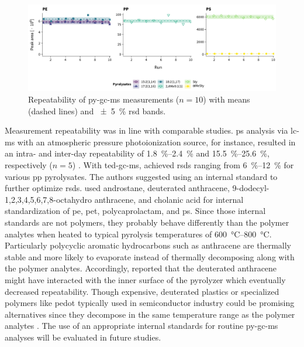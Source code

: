 \begin{figure}[t]
	\centering
	\includegraphics[width=\textwidth]{figures/py-repeatability}
	\caption[Repeatability of \ac{py-gc-ms} measurements.]{Repeatability of \ac{py-gc-ms} measurements ($n = 10$) with means (dashed lines) and \SI{+-5}{\percent} \acs{rsd} bands.}
	\label{fig:py-repeatability}
\end{figure}

Measurement repeatability was in line with comparable studies. \Ac{ps} analysis via \ac{lc-ms} with an atmospheric pressure photoionization source, for instance, resulted in an intra- and inter-day repeatability of \SIrange{1.8}{2.4}{\percent} and \SIrange{15.5}{25.6}{\percent}, respectively ($n = 5$) \citep{SchirinziTrace2019}. With \ac{ted-gc-ms}, \citet{DuemichenAutomated2019} achieved \acp{rsd} ranging from \SIrange[range-phrase = { to }]{6}{12}{\percent} for various \ac{pp} pyrolysates. The authors suggested using an internal standard to further optimize \acp{rsd}. \citet{FischerMicroplastics2019} used androstane, deuterated anthracene, 9-dodecyl-1,2,3,4,5,6,7,8-octahydro anthracene, and cholanic acid for internal standardization of \ac{pe}, \ac{pet}, polycaprolactam, and \ac{ps}. Since those internal standards are not polymers, they probably behave differently than the polymer analytes when heated to typical pyrolysis temperatures of \SIrange{600}{800}{\degreeCelsius}. Particularly polycyclic aromatic hydrocarbons such as anthracene are thermally stable and more likely to evaporate instead of thermally decomposing along with the polymer analytes. Accordingly, \citet{FischerMicroplastics2019} reported that the deuterated anthracene might have interacted with the inner surface of the pyrolyzer which eventually decreased repeatability. Though expensive, deuterated plastics \citep{DierkesQuantification2019} or specialized polymers like \ac{pedot} typically used in semiconductor industry could be promising alternatives since they decompose in the same temperature range as the polymer analytes \citep{JinThermal2013}. The use of an appropriate internal standards for routine \ac{py-gc-ms} analyses will be evaluated in future studies.

